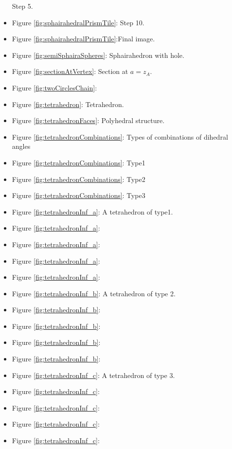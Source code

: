 \documentclass[suppldata, dvipdfmx]{interact}
\theoremstyle{plain}%
\theoremstyle{definition}
\theoremstyle{remark}
\theoremstyle{problemstyle}
\begin{document}
\begin{itemize}
       Step 5.
 \item Figure \ref{fig:sphairahedralPrismTile}:
       Step 10.
 \item Figure
       \ref{fig:sphairahedralPrismTile}:Final
       image.
\item Figure \ref{fig:semiSphairaSpheres}: Sphairahedron with hole.
\item Figure \ref{fig:sectionAtVertex}: Section at $a=z_A$.
\item Figure \ref{fig:twoCirclesChain}:
\item Figure \ref{fig:tetrahedron}: Tetrahedron.
\item Figure \ref{fig:tetrahedronFaces}: Polyhedral structure.

\item Figure \ref{fig:tetrahedronCombinations}: Types of combinations
      of dihedral angles
\item Figure \ref{fig:tetrahedronCombinations}:
      Type1
\item Figure \ref{fig:tetrahedronCombinations}:
      Type2
\item Figure \ref{fig:tetrahedronCombinations}:
      Type3

\item Figure \ref{fig:tetrahedronInf_a}: A tetrahedron of type1.
\item Figure \ref{fig:tetrahedronInf_a}:
\item Figure \ref{fig:tetrahedronInf_a}:
\item Figure \ref{fig:tetrahedronInf_a}:
\item Figure
      \ref{fig:tetrahedronInf_a}:

\item Figure \ref{fig:tetrahedronInf_b}: A tetrahedron of type 2.
\item Figure
      \ref{fig:tetrahedronInf_b}:
\item Figure
      \ref{fig:tetrahedronInf_b}:
\item Figure \ref{fig:tetrahedronInf_b}:
\item Figure \ref{fig:tetrahedronInf_b}:

\item Figure \ref{fig:tetrahedronInf_c}: A tetrahedron of type 3.
\item Figure \ref{fig:tetrahedronInf_c}:
\item Figure
      \ref{fig:tetrahedronInf_c}:
\item Figure \ref{fig:tetrahedronInf_c}:
\item Figure \ref{fig:tetrahedronInf_c}:


\end{itemize}
\end{document}
